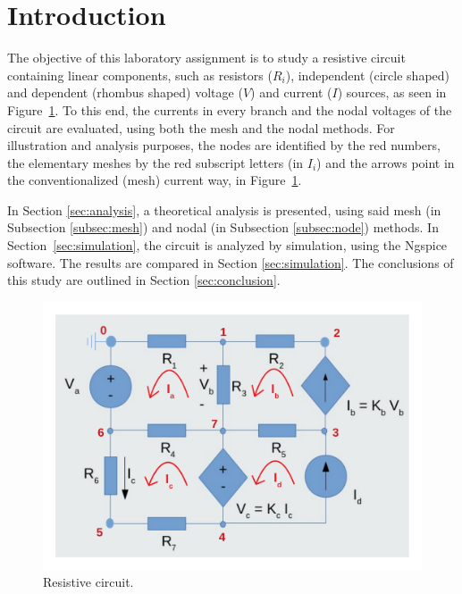 \section{Introduction}
\label{sec:introduction}

The objective of this laboratory assignment is to study a resistive circuit containing linear components, 
such as resistors ($R_i$), independent (circle shaped) and dependent (rhombus shaped) voltage ($V$) and current ($I$) 
sources, as seen in Figure~\ref{fig:esq}. To this end, the currents in every branch and the nodal voltages of the circuit 
are evaluated, using both the mesh and the nodal methods. For illustration and analysis purposes, the nodes are identified
 by the red numbers, the elementary meshes by the red subscript letters (in $I_i$) and the arrows point in the 
 conventionalized (mesh) current way, in Figure~\ref{fig:esq}.

In Section \ref{sec:analysis}, a theoretical analysis is presented, using said mesh (in Subsection \ref{subsec:mesh}) and nodal (in Subsection \ref{subsec:node}) methods. In Section~\ref{sec:simulation}, the circuit is analyzed by simulation, using the Ngspice software.
The results are compared in Section \ref{sec:simulation}. The conclusions of this study are outlined in
Section \ref{sec:conclusion}.



\begin{figure}[h] \centering
\includegraphics[width=0.8\linewidth]{esq_circ.pdf}
\caption{Resistive circuit.}
\label{fig:esq}
\end{figure}

